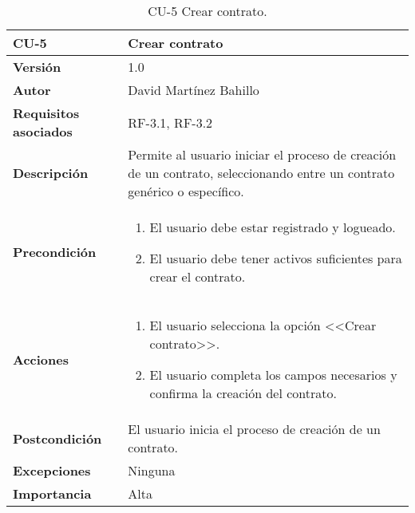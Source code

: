 \begin{table}[p]
	\centering
	\begin{tabularx}{\linewidth}{ p{} p{} }
		\toprule
		\textbf{CU-5}    & \textbf{Crear contrato}\\
		\midrule
		\textbf{Versión}              & 1.0    \\
		\textbf{Autor}                & David Martínez Bahillo \\
		\textbf{Requisitos asociados} & RF-3.1, RF-3.2 \\
		\textbf{Descripción}          & Permite al usuario iniciar el proceso de creación de un contrato, seleccionando entre un contrato genérico o específico. \\
		\textbf{Precondición}         &  
		\begin{enumerate}
			\def\labelenumi{\arabic{enumi}.}
			\tightlist
			\item El usuario debe estar registrado y logueado.
			\item El usuario debe tener activos suficientes para crear el contrato.
		\end{enumerate}\\
		\textbf{Acciones}             &
		\begin{enumerate}
			\def\labelenumi{\arabic{enumi}.}
			\tightlist
			\item El usuario selecciona la opción <<Crear contrato>>.
			\item El usuario completa los campos necesarios y confirma la creación del contrato.
		\end{enumerate}\\
		\textbf{Postcondición}        & El usuario inicia el proceso de creación de un contrato. \\
		\textbf{Excepciones}          & Ninguna \\
		\textbf{Importancia}          & Alta  \\
		\bottomrule
	\end{tabularx}
	\caption{CU-5 Crear contrato.}
\end{table}


